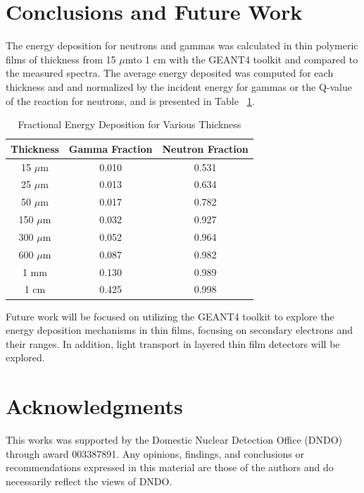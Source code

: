 \documentclass{anstrans}
\newcommand{\micron}{$\mu$m}
\begin{document}
\section{Conclusions and Future Work}
The energy deposition for neutrons and gammas was calculated in thin polymeric films of thickness from 15 \micron to 1 cm with the GEANT4 toolkit and compared to the measured spectra.
The average energy deposited was computed for each thickness and and normalized by the incident energy for gammas or the Q-value of the reaction for neutrons, and is presented in Table ~\ref{tab:FractionEDep}.
\begin{table}[!htb]
    \caption{Fractional Energy Deposition for Various Thickness}
	\centering
	\begin{tabular}{c | c c}
	Thickness & Gamma Fraction & Neutron Fraction \\
	\hline
	\hline
	15 \micron & 0.010 & 0.531 \\
	25 \micron & 0.013 & 0.634 \\
	50 \micron & 0.017 & 0.782 \\
	150 \micron & 0.032 & 0.927 \\
	300 \micron & 0.052 & 0.964 \\
	600 \micron & 0.087 & 0.982 \\
	1 mm & 0.130 & 0.989 \\
	1 cm & 0.425 & 0.998 \\
	\hline
	\end{tabular}
    \label{tab:FractionEDep}
\end{table}
Future work will be focused on utilizing the GEANT4 toolkit to explore the energy deposition mechanisms in thin films, focusing on secondary electrons and their ranges. 
In addition, light transport in layered thin film detectors will be explored.
\section{Acknowledgments}
This works was supported by the Domestic Nuclear Detection Office (DNDO) through award 003387891.
Any opinions, findings, and conclusions or recommendations expressed in this material are those of the authors and do necessarily reflect the views of DNDO.

%


\end{document}
